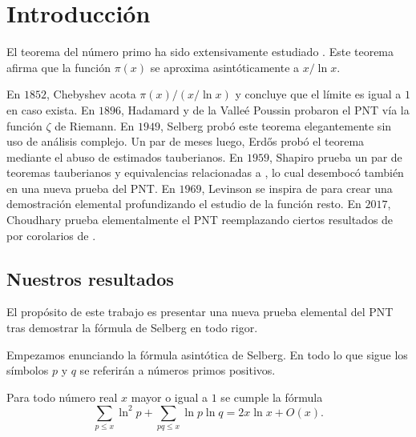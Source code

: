 \setlength{\headheight}{14.61858pt}
\pagestyle{fancy}

\chapter[Introducci\'on]
{Introducci\'on}
\label{ch:introduction}

\vspace*{1cm}

El teorema del n\'umero primo ha sido extensivamente estudiado
\cite{
  Breusch1960,
  Choudhary2017,
  Diamond1982,
  Erdos1949,
  Levinson1969,
  Liu2022,
  Newman1980,
  Richter2021,
  Selberg1949,
  Shapiro1959}.
Este teorema afirma que la funci\'on \(\pi(x)\) se aproxima
asint\'oticamente a \(x / \ln x\).

En \(1852\), Chebyshev \cite{Chebyshev1852} acota \(\pi(x) / (x / \ln x)\)
y concluye que el l\'imite es igual a \(1\) en caso exista.
En \(1896\), Hadamard \cite{Hadamard1896} y de la Valle\'e Poussin
probaron el PNT v\'ia la funci\'on \(\zeta\) de Riemann.
En \(1949\), Selberg \cite{Selberg1949}
prob\'o este teorema elegantemente sin uso de an\'alisis complejo.
Un par de meses luego, Erdős \cite{Erdos1949}
prob\'o el teorema mediante el abuso de estimados tauberianos.
En \(1959\), Shapiro \cite{Shapiro1959}
prueba un par de teoremas tauberianos y equivalencias relacionadas a \cite{Erdos1949},
lo cual desemboc\'o tambi\'en en una nueva prueba del PNT.
En \(1969\), Levinson \cite{Levinson1969} se inspira de \cite{Selberg1949, Breusch1960}
para crear una demostraci\'on elemental
profundizando el estudio de la funci\'on resto.
En \(2017\), Choudhary \cite{Choudhary2017} prueba elementalmente el PNT
reemplazando ciertos resultados de \cite{Levinson1969}
por corolarios de \cite{Shapiro1959}.

\section{Nuestros resultados}

El prop\'osito de este trabajo es presentar una nueva prueba elemental del PNT
tras demostrar la f\'ormula de Selberg en todo rigor.

\bigskip

Empezamos enunciando la f\'ormula asint\'otica de Selberg. 
En todo lo que sigue los s\'imbolos \(p\) y \(q\) se referir\'an a
n\'umeros primos positivos.

\begin{theorem}
  Para todo n\'umero real \(x\) mayor o igual a \(1\)
  se cumple la f\'ormula
  \[
    \sum_{p \leq x} \ln^2 p + \sum_{pq \leq x} \ln p \ln q = 2x\ln x + O(x).
  \]
\end{theorem}

